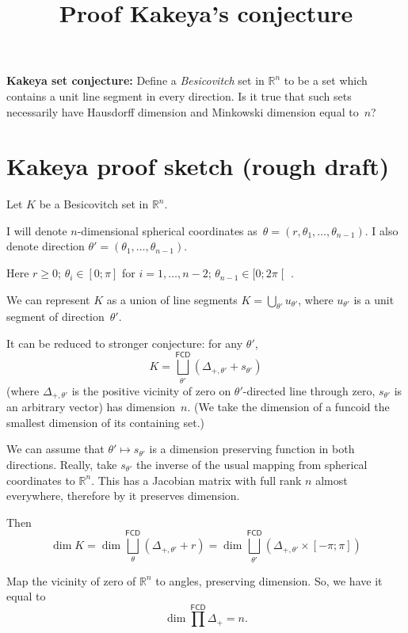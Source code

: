 \documentclass{amsart}
\title{Proof Kakeya's conjecture}
\newcommand{\funcoids}{\mathsf{FCD}}
\begin{document}
\textbf{Kakeya set conjecture:} Define a \emph{Besicovitch} set in $\mathbb{R}^n$ to be a set which contains a unit line segment in every direction. Is it true that such sets necessarily have Hausdorff dimension and Minkowski dimension equal to~$n$?

\section{Kakeya proof sketch (rough draft)}

Let $K$ be a Besicovitch set in $\mathbb{R}^n$.

I will denote $n$-dimensional spherical coordinates as~$\theta=(r, \theta_1,\dots,\theta_{n-1})$.
I also denote direction $\theta'=(\theta_1,\dots,\theta_{n-1})$.

Here $r\geq 0$; $\theta_i\in[0;\pi]$ for $i=1,\dots,n-2$; $\theta_{n-1}\in[0;2\pi\mathclose[$ .

We can represent $K$ as a union of line segments $K = \bigcup_{\theta'} u_{\theta'}$, where $u_{\theta'}$ is a unit segment of direction~$\theta'$.

It can be reduced to stronger conjecture: for any $\theta'$, \[ K = \bigsqcup^{\funcoids}_{\theta'} (\Delta_{+,\theta'}+s_{\theta'}) \] (where $\Delta_{+,\theta'}$ is the positive vicinity of zero on $\theta'$-di\-rec\-ted line through zero, $s_{\theta'}$ is an arbitrary vector) has dimension~$n$. (We take the dimension of a funcoid the smallest dimension of its containing set.)

We can assume that $\theta'\mapsto s_{\theta'}$ is a dimension preserving function in both directions. Really,
take $s_{\theta'}$ the inverse of the usual mapping from spherical coordinates to $\mathbb{R}^n$. This has
a Jacobian matrix with full rank $n$ almost everywhere, therefore by \cite{gpt-preserve-dim} it preserves dimension.

Then \[ \dim K = \dim\bigsqcup^{\funcoids}_{\theta} (\Delta_{{+,\theta'}}+r) = \dim\bigsqcup^{\funcoids}_{\theta'}(\Delta_{{+,\theta'}}\times[-\pi;\pi]) \]

Map the vicinity of zero of $\mathbb{R}^n$ to angles, preserving dimension. So, we have it equal to
\[ \dim\prod^{\funcoids}\Delta_{+} = n. \]



\end{document}
